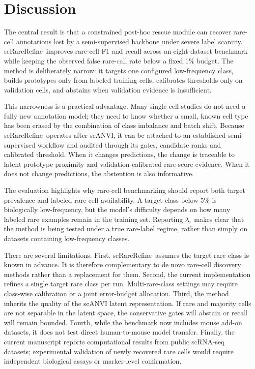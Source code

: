 \documentclass[11pt]{article}
\newcommand{\method}{scRareRefine}
\newcommand{\rare}{r}
\begin{document}
\section{Discussion}

The central result is that a constrained post-hoc rescue module can recover
rare-cell annotations lost by a semi-supervised backbone under severe label
scarcity. \method\ improves rare-cell F1 and recall across an eight-dataset
benchmark while keeping the observed false rare-call rate below a fixed 1\%
budget. The method is deliberately narrow: it targets one configured
low-frequency class, builds prototypes only from labeled training cells,
calibrates thresholds only on validation cells, and abstains when validation
evidence is insufficient.

This narrowness is a practical advantage. Many single-cell studies do not need
a fully new annotation model; they need to know whether a small, known cell type
has been erased by the combination of class imbalance and batch shift. Because
\method\ operates after scANVI, it can be attached to an established
semi-supervised workflow and audited through its gates, candidate ranks and
calibrated threshold. When it changes predictions, the change is traceable to
latent prototype proximity and validation-calibrated rare-score evidence. When
it does not change predictions, the abstention is also informative.

The evaluation highlights why rare-cell benchmarking should report both target
prevalence and labeled rare-cell availability. A target class below 5\% is
biologically low-frequency, but the model's difficulty depends on how many
labeled rare examples remain in the training set. Reporting $\lambda_\rare$
makes clear that the method is being tested under a true rare-label regime,
rather than simply on datasets containing low-frequency classes.

There are several limitations. First, \method\ assumes the target rare class is
known in advance. It is therefore complementary to de novo rare-cell discovery
methods rather than a replacement for them. Second, the current implementation
refines a single target rare class per run. Multi-rare-class settings may
require class-wise calibration or a joint error-budget allocation. Third, the
method inherits the quality of the scANVI latent representation. If rare and
majority cells are not separable in the latent space, the conservative gates
will abstain or recall will remain bounded. Fourth, while the benchmark now
includes mouse add-on datasets, it does not test direct human-to-mouse model
transfer. Finally, the current manuscript reports computational results from
public scRNA-seq datasets; experimental validation of newly recovered rare
cells would require independent biological assays or marker-level confirmation.
\end{document}
